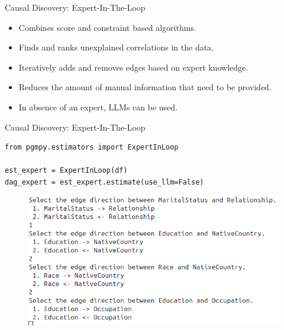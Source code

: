 \documentclass[aspectratio=169]{beamer}
\begin{document}
\begin{frame}{Causal Discovery: Expert-In-The-Loop}

	\vspace{2em}

	\begin{itemize}
		\item Combines score and constraint based algorithms.
		\item Finds and ranks unexplained correlations in the data.
		\item Iteratively adds and removes edges based on expert knowledge.
		\item Reduces the amount of manual information that need to be provided.
		\item In absence of an expert, LLMs can be used.
	\end{itemize}
\end{frame}

\begin{frame}[fragile]{Causal Discovery: Expert-In-The-Loop}
	\begin{verbatim}
from pgmpy.estimators import ExpertInLoop

est_expert = ExpertInLoop(df)
dag_expert = est_expert.estimate(use_llm=False)
	\end{verbatim}
	\begin{figure}
		\includegraphics[scale=0.4, left]{imgs/expert_prompt.png}
	\end{figure}
\end{frame}
\end{document}
